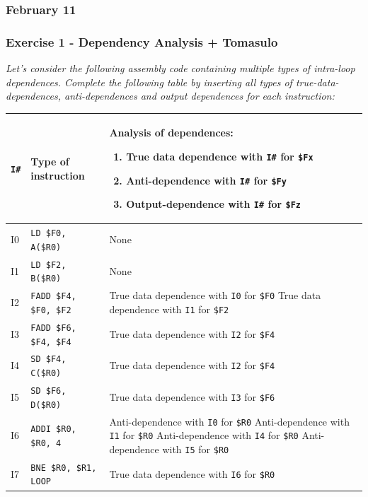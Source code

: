 \subsubsection{February 11}

\subsubsection*{Exercise 1 - Dependency Analysis + Tomasulo}

\emph{Let's consider the following assembly code containing multiple types of intra-loop dependences. Complete the following table by inserting all types of true-data-dependences, anti-dependences and output dependences for each instruction:}

\highspace
\answer
\begin{table}[!htp]
    \centering
    \begin{tabular}{@{} l | l | p{20em} @{}}
        \toprule
        \texttt{I\#} & \textbf{Type of instruction}   & \textbf{Analysis of dependences:} \begin{enumerate}
            \item True data dependence with \texttt{I\#} for \texttt{\$Fx}
            \item Anti-dependence with \texttt{I\#} for \texttt{\$Fy}
            \item Output-dependence with \texttt{I\#} for \texttt{\$Fz}
        \end{enumerate} \\
        \midrule
        I0  & \texttt{LD \$F0, A(\$R0)} & None \\ [.3em]
        I1  & \texttt{LD \$F2, B(\$R0)} & None \\ [.3em]
        I2  & \texttt{FADD \$F4, \$F0, \$F2} & True data dependence with \texttt{I0} for \texttt{\$F0} \newline True data dependence with \texttt{I1} for \texttt{\$F2} \\ [.3em]
        I3  & \texttt{FADD \$F6, \$F4, \$F4} & True data dependence with \texttt{I2} for \texttt{\$F4} \\ [.3em]
        I4  & \texttt{SD \$F4, C(\$R0)} & True data dependence with \texttt{I2} for \texttt{\$F4} \\ [.3em]
        I5  & \texttt{SD \$F6, D(\$R0)} & True data dependence with \texttt{I3} for \texttt{\$F6} \\ [.3em]
        I6  & \texttt{ADDI \$R0, \$R0, 4} & Anti-dependence with \texttt{I0} for \texttt{\$R0}
        \newline
        Anti-dependence with \texttt{I1} for \texttt{\$R0}
        \newline
        Anti-dependence with \texttt{I4} for \texttt{\$R0}
        \newline
        Anti-dependence with \texttt{I5} for \texttt{\$R0} \\ [.3em]
        I7  & \texttt{BNE \$R0, \$R1, LOOP} & True data dependence with \texttt{I6} for \texttt{\$R0} \\
        \bottomrule
    \end{tabular}
\end{table}

